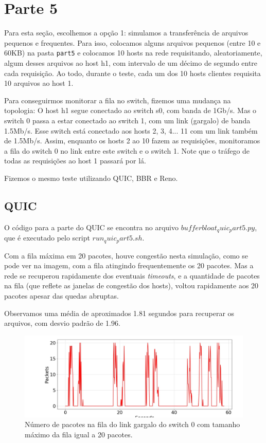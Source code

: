 \documentclass[a4paper,12pt]{article}
\newcommand{\code}[1]{\texttt{#1}}
\begin{document}
\section{Parte 5}

Para esta seção, escolhemos a opção 1: simulamos a transferência de arquivos pequenos e frequentes. Para isso, colocamos alguns arquivos pequenos (entre 10 e 60KB) na pasta \code{part5} e colocamos 10 hosts na rede requisitando, aleatoriamente, algum desses arquivos ao host h1, com intervalo de um décimo de segundo entre cada requisição. Ao todo, durante o teste, cada um dos 10 hosts clientes requisita 10 arquivos ao host 1.

Para conseguirmos monitorar a fila no switch, fizemos uma mudança na topologia: O host h1 segue conectado ao switch s0, com banda de 1Gb/s. Mas o switch 0 passa a estar conectado ao switch 1, com um link (gargalo) de banda 1.5Mb/s. Esse switch está conectado aos hosts 2, 3, 4... 11 com um link também de 1.5Mb/s. Assim, enquanto os hosts 2 ao 10 fazem as requisições, monitoramos a fila do switch 0 no link entre este switch e o switch 1. Note que o tráfego de todas as requisições ao host 1 passará por lá. 

Fizemos o mesmo teste utilizando QUIC, BBR e Reno. 

\subsection{QUIC}

O código para a parte do QUIC se encontra no arquivo $bufferbloat_quic_part5.py$, que é executado pelo script $run_quic_part5.sh$.

Com a fila máxima em 20 pacotes, houve congestão nesta simulação, como se pode ver na imagem, com a fila atingindo frequentemente os 20 pacotes. Mas a rede se recuperou rapidamente dos eventuais \textit{timeouts}, e a quantidade de pacotes na fila (que reflete as janelas de congestão dos hosts), voltou rapidamente aos 20 pacotes apesar das quedas abruptas. 

Observamos uma média de aproximados 1.81 segundos para recuperar os arquivos, com desvio padrão de 1.96.

\begin{figure}[ht!]
  \centering
  \includegraphics[width=0.5\columnwidth]{./bufferbloat/bb-q20/quic-part5-buffer-q20.jpg}
  \caption{Número de pacotes na fila do link gargalo do switch 0 com tamanho máximo da fila igual a 20 pacotes.}
\end{figure}
\end{document}
